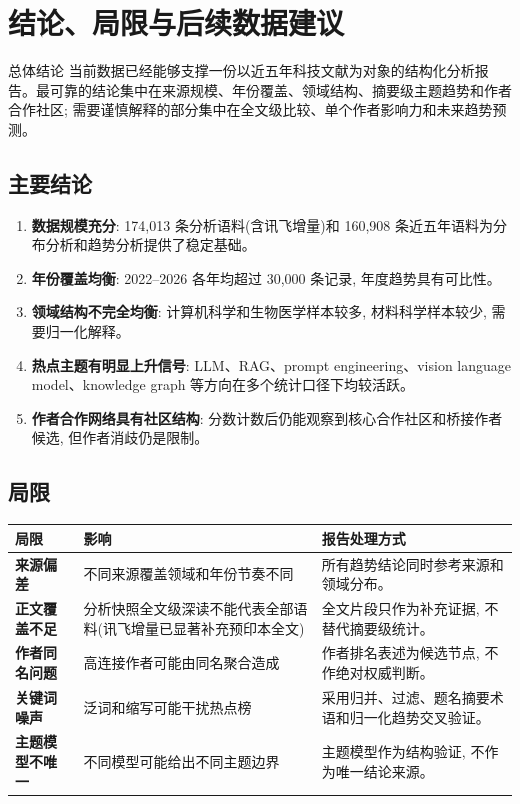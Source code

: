\section{结论、局限与后续数据建议}

\begin{reportbox}{总体结论}
当前数据已经能够支撑一份以近五年科技文献为对象的结构化分析报告。最可靠的结论集中在来源规模、年份覆盖、领域结构、摘要级主题趋势和作者合作社区; 需要谨慎解释的部分集中在全文级比较、单个作者影响力和未来趋势预测。
\end{reportbox}

\subsection{主要结论}

\begin{enumerate}
  \item \textbf{数据规模充分}: 174,013 条分析语料(含讯飞增量)和 160,908 条近五年语料为分布分析和趋势分析提供了稳定基础。
  \item \textbf{年份覆盖均衡}: 2022--2026 各年均超过 30,000 条记录, 年度趋势具有可比性。
  \item \textbf{领域结构不完全均衡}: 计算机科学和生物医学样本较多, 材料科学样本较少, 需要归一化解释。
  \item \textbf{热点主题有明显上升信号}: LLM、RAG、prompt engineering、vision language model、knowledge graph 等方向在多个统计口径下均较活跃。
  \item \textbf{作者合作网络具有社区结构}: 分数计数后仍能观察到核心合作社区和桥接作者候选, 但作者消歧仍是限制。
\end{enumerate}

\subsection{局限}

\begin{tableblock}
\begin{tabularx}{\textwidth}{>{\bfseries}p{35mm}X X}
\toprule
局限 & 影响 & 报告处理方式 \\
\midrule
来源偏差 & 不同来源覆盖领域和年份节奏不同 & 所有趋势结论同时参考来源和领域分布。 \\
正文覆盖不足 & 分析快照全文级深读不能代表全部语料(讯飞增量已显著补充预印本全文) & 全文片段只作为补充证据, 不替代摘要级统计。 \\
作者同名问题 & 高连接作者可能由同名聚合造成 & 作者排名表述为候选节点, 不作绝对权威判断。 \\
关键词噪声 & 泛词和缩写可能干扰热点榜 & 采用归并、过滤、题名摘要术语和归一化趋势交叉验证。 \\
主题模型不唯一 & 不同模型可能给出不同主题边界 & 主题模型作为结构验证, 不作为唯一结论来源。 \\
\bottomrule
\end{tabularx}
\end{tableblock}

